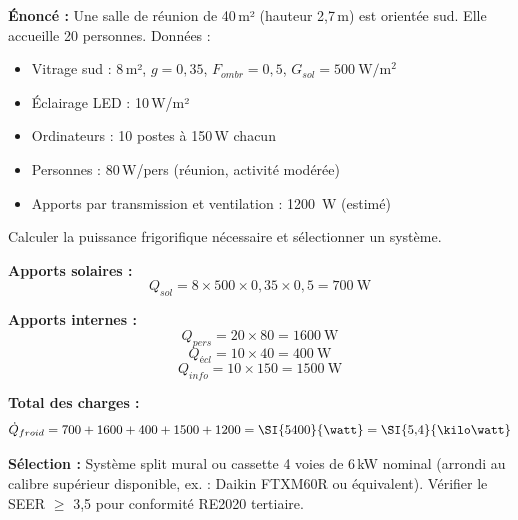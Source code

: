 \begin{exemple}[title=Dimensionnement d'une climatisation de salle de réunion]
\textbf{Énoncé :} Une salle de réunion de 40\,m² (hauteur 2,7\,m) est orientée sud. Elle accueille 20 personnes. Données :
\begin{itemize}
  \item Vitrage sud : 8\,m², $g = 0{,}35$, $F_{ombr} = 0{,}5$, $G_{sol} = \SI{500}{\watt\per\square\metre}$
  \item Éclairage LED : 10\,W/m²
  \item Ordinateurs : 10 postes à 150\,W chacun
  \item Personnes : 80\,W/pers (réunion, activité modérée)
  \item Apports par transmission et ventilation : \SI{1200}{\watt} (estimé)
\end{itemize}
Calculer la puissance frigorifique nécessaire et sélectionner un système.

\textbf{Apports solaires :}
\[
  Q_{sol} = 8 \times 500 \times 0{,}35 \times 0{,}5 = \SI{700}{\watt}
\]

\textbf{Apports internes :}
\[
  Q_{pers} = 20 \times 80 = \SI{1600}{\watt}
\]
\[
  Q_{écl} = 10 \times 40 = \SI{400}{\watt}
\]
\[
  Q_{info} = 10 \times 150 = \SI{1500}{\watt}
\]

\textbf{Total des charges :}
\[
  \dot{Q}_{froid} = 700 + 1600 + 400 + 1500 + 1200 = \SI{5400}{\watt} = \SI{5{,}4}{\kilo\watt}
\]

\textbf{Sélection :} Système split mural ou cassette 4 voies de 6\,kW nominal (arrondi au calibre supérieur disponible, ex. : Daikin FTXM60R ou équivalent). Vérifier le SEER $\geq$ 3,5 pour conformité RE2020 tertiaire.
\end{exemple}


